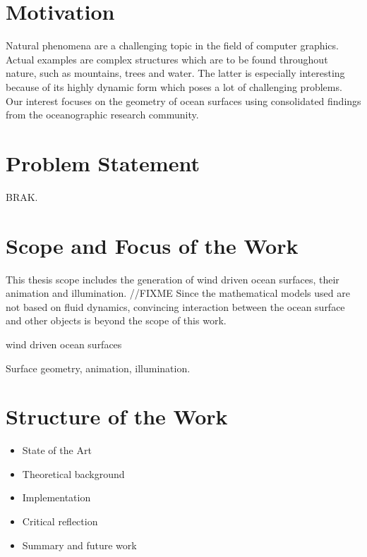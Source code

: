 \section{Motivation}
\label{sec:motivation}

Natural phenomena are a challenging topic in the field of computer graphics.
Actual examples are complex structures which are to be found throughout nature,
such as mountains, trees and water. The latter is especially interesting
because of its highly dynamic form which poses a lot of challenging problems.
Our interest focuses on the geometry of ocean surfaces using
consolidated findings from the oceanographic research community.

\section{Problem Statement}
\label{sec:problem_statement}

BRAK.

\section{Scope and Focus of the Work}
\label{sec:scope_and_focus}

This thesis scope includes the generation of wind driven ocean surfaces, their
animation and illumination. //FIXME
Since the mathematical models used are not based on fluid dynamics,
convincing interaction between the ocean surface and other objects is beyond the
scope of this work.

wind driven ocean surfaces

Surface geometry, animation, illumination.

\section{Structure of the Work}
\label{sec:structure}

\begin{itemize}

\item State of the Art
\item Theoretical background
\item Implementation
\item Critical reflection
\item Summary and future work

\end{itemize}
